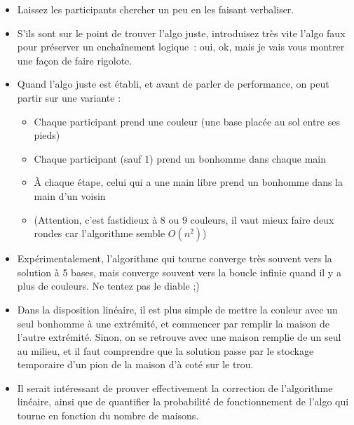 \documentclass[a5paper,pagesize,DIV=14]{scrbook}
\begin{document}
\begin{itemize}
\item Laissez les participants chercher un peu en les faisant verbaliser.
\item S'ils sont sur le point de trouver l'algo juste, introduisez très vite
  l'algo faux pour préserver un enchaînement logique~: \og oui, ok, mais je vais
  vous montrer une façon de faire rigolote. \fg
\item Quand l'algo juste est établi, et avant de parler de performance, on peut
  partir sur une variante :
  \begin{itemize}
  \item Chaque participant prend une couleur (une base placée au sol entre ses
    pieds)
  \item Chaque participant (sauf 1) prend un bonhomme dans chaque main
  \item À chaque étape, celui qui a une main libre prend un bonhomme dans la
    main d'un voisin
  \item (Attention, c'est fastidieux à 8 ou 9 couleurs, il vaut mieux faire deux
    rondes car l'algorithme semble $O(n^2)$)
  \end{itemize}
\item Expérimentalement, l'algorithme qui tourne converge très souvent vers la
  solution à 5 bases, mais converge souvent vers la boucle infinie quand il y a
  plus de couleurs. Ne tentez pas le diable ;)
\item Dans la disposition linéaire, il est plus simple de mettre la couleur avec
  un seul bonhomme à une extrémité, et commencer par remplir la maison de
  l'autre extrémité. Sinon, on se retrouve avec une maison remplie de un seul au
  milieu, et il faut comprendre que la solution passe par le stockage temporaire
  d'un pion de la maison d'à coté sur le trou.
\item Il serait intéressant de prouver effectivement la correction de
  l'algorithme linéaire, ainsi que de quantifier la probabilité de
  fonctionnement de l'algo qui tourne en fonction du nombre de maisons.
\end{itemize}
\end{document}
